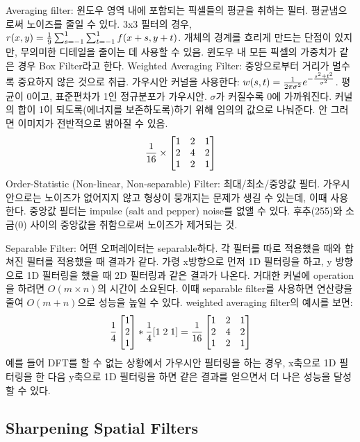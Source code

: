 \bitmz
  \itm Averaging filter: 윈도우 영역 내에 포함되는 픽셀들의 평균을 취하는 필터. 평균냄으로써 노이즈를 줄일 수 있다. 3x3 필터의 경우, $r(x, y) = {1 \over 9} \sum_{s=-1}^1 \sum_{t=-1}^1 f(x + s, y + t)$. 개체의 경계를 흐리게 만드는 단점이 있지만, 무의미한 디테일을 줄이는 데 사용할 수 있음. 윈도우 내 모든 픽셀의 가중치가 같은 경우 Box Filter라고 한다.
  \itm Weighted Averaging Filter: 중앙으로부터 거리가 멀수록 중요하지 않은 것으로 취급. 가우시안 커널을 사용한다: $w(s, t) = {1 \over 2\pi\sigma^2}e^{-{s^2 + t^2 \over \sigma^2}}$. 평균이 0이고, 표준편차가 1인 정규분포가 가우시안. $\sigma$가 커질수록 0에 가까워진다. 커널의 합이 1이 되도록(에너지를 보존하도록)하기 위해 임의의 값으로 나눠준다. 안 그러면 이미지가 전반적으로 밝아질 수 있음. $${1 \over 16} \times \begin{bmatrix} 1 & 2 & 1 \\ 2 & 4 & 2 \\ 1 & 2 & 1 \end{bmatrix}$$
  \itm Order-Statistic (Non-linear, Non-separable) Filter: 최대/최소/중앙값 필터. 가우시안으로는 노이즈가 없어지지 않고 형상이 뭉개지는 문제가 생길 수 있는데, 이때 사용한다. 중앙값 필터는 impulse (salt and pepper) noise를 없앨 수 있다. 후추(255)와 소금(0) 사이의 중앙값을 취함으로써 노이즈가 제거되는 것.
\eitmz

Separable Filter: 어떤 오퍼레이터는 separable하다. 각 필터를 따로 적용했을 때와 합쳐진 필터를 적용했을 때 결과가 같다. 가령 x방향으로 먼저 1D 필터링을 하고, y 방향으로 1D 필터링을 했을 때 2D 필터링과 같은 결과가 나온다. 거대한 커널에 operation을 하려면 $O(m \times n)$의 시간이 소요된다. 이때 separable filter를 사용하면 연산량을 줄여 $O(m + n)$으로 성능을 높일 수 있다. weighted averaging filter의 예시를 보면:
$$
{1 \over 4}
\begin{bmatrix}
  1 \\
  2 \\
  1
\end{bmatrix}
\ast {1 \over 4} [1 \; 2 \; 1] = {1 \over 16}
\begin{bmatrix}
  1 & 2 & 1 \\
  2 & 4 & 2 \\
  1 & 2 & 1
\end{bmatrix}
$$
예를 들어 DFT를 할 수 없는 상황에서 가우시안 필터링을 하는 경우, x축으로 1D 필터링을 한 다음 y축으로 1D 필터링을 하면 같은 결과를 얻으면서 더 나은 성능을 달성할 수 있다.

\subsection{Sharpening Spatial Filters}

